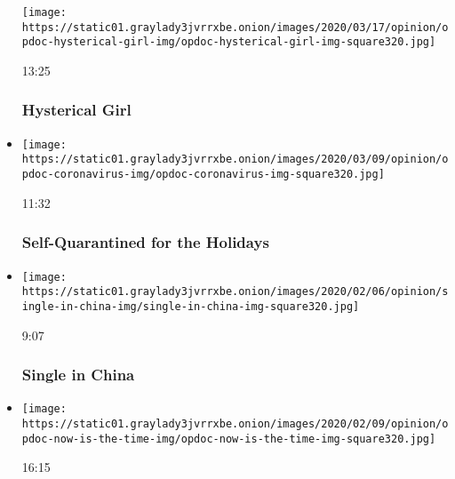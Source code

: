 \begin{itemize}
  \texttt{[image: https://static01.graylady3jvrrxbe.onion/images/2020/03/17/opinion/opdoc-hysterical-girl-img/opdoc-hysterical-girl-img-square320.jpg]}

  13:25

  \hypertarget{hysterical-girl}{%
  \subsubsection{Hysterical Girl}\label{hysterical-girl}}
\item
  \href{https://www.nytimes3xbfgragh.onion/video/opinion/100000007013675/self-quarantined-for-the-holidays.html?action=click\&module=video-series-bar\&region=header\&pgtype=Article\&playlistId=video/op-docs}{}

  \texttt{[image: https://static01.graylady3jvrrxbe.onion/images/2020/03/09/opinion/opdoc-coronavirus-img/opdoc-coronavirus-img-square320.jpg]}

  11:32

  \hypertarget{self-quarantined-for-the-holidays}{%
  \subsubsection{Self-Quarantined for the
  Holidays}\label{self-quarantined-for-the-holidays}}
\item
  \href{https://www.nytimes3xbfgragh.onion/video/opinion/100000006948977/single-in-china.html?action=click\&module=video-series-bar\&region=header\&pgtype=Article\&playlistId=video/op-docs}{}

  \texttt{[image: https://static01.graylady3jvrrxbe.onion/images/2020/02/06/opinion/single-in-china-img/single-in-china-img-square320.jpg]}

  9:07

  \hypertarget{single-in-china}{%
  \subsubsection{Single in China}\label{single-in-china}}
\item
  \href{https://www.nytimes3xbfgragh.onion/video/opinion/100000006946174/now-is-the-time.html?action=click\&module=video-series-bar\&region=header\&pgtype=Article\&playlistId=video/op-docs}{}

  \texttt{[image: https://static01.graylady3jvrrxbe.onion/images/2020/02/09/opinion/opdoc-now-is-the-time-img/opdoc-now-is-the-time-img-square320.jpg]}

  16:15


\end{itemize}
